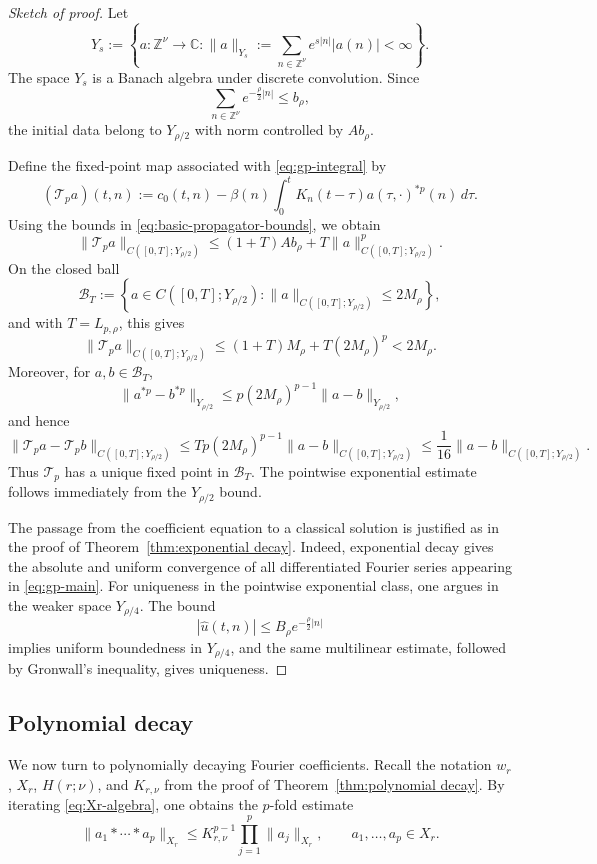\documentclass[12pt,reqno,tbtags]{amsart}
\newcommand\1{\mathbbm{1}}
\begin{document}
\begin{proof}[Sketch of proof]
Let
\[
Y_s
:=
\left\{
a:\mathbb Z^\nu\to\mathbb C:
\|a\|_{Y_s}:=\sum_{n\in\mathbb Z^\nu}e^{s|n|}|a(n)|<\infty
\right\}.
\]
The space $Y_s$ is a Banach algebra under discrete convolution. Since
\[
\sum_{n\in\mathbb Z^\nu}e^{-\frac{\rho}{2}|n|}
\le b_\rho,
\]
the initial data belong to $Y_{\rho/2}$ with norm controlled by $Ab_\rho$.

Define the fixed-point map associated with \eqref{eq:gp-integral} by
\[
(\mathcal T_p a)(t,n)
:=
c_0(t,n)
-
\beta(n)\int_0^t K_n(t-\tau)a(\tau,\cdot)^{*p}(n)\,d\tau .
\]
Using the bounds in \eqref{eq:basic-propagator-bounds}, we obtain
\[
\|\mathcal T_p a\|_{C([0,T];Y_{\rho/2})}
\le
(1+T)Ab_\rho
+
T\|a\|_{C([0,T];Y_{\rho/2})}^{p}.
\]
On the closed ball
\[
\mathcal B_T
:=
\left\{
a\in C([0,T];Y_{\rho/2}):
\|a\|_{C([0,T];Y_{\rho/2})}\le2M_\rho
\right\},
\]
and with $T=L_{p,\rho}$, this gives
\[
\|\mathcal T_p a\|_{C([0,T];Y_{\rho/2})}
\le
(1+T)M_\rho+T(2M_\rho)^p
<2M_\rho.
\]
Moreover, for $a,b\in\mathcal B_T$,
\[
\|a^{*p}-b^{*p}\|_{Y_{\rho/2}}
\le
p(2M_\rho)^{p-1}\|a-b\|_{Y_{\rho/2}},
\]
and hence
\[
\|\mathcal T_p a-\mathcal T_p b\|_{C([0,T];Y_{\rho/2})}
\le
Tp(2M_\rho)^{p-1}
\|a-b\|_{C([0,T];Y_{\rho/2})}
\le
\frac1{16}
\|a-b\|_{C([0,T];Y_{\rho/2})}.
\]
Thus $\mathcal T_p$ has a unique fixed point in $\mathcal B_T$. The pointwise
exponential estimate follows immediately from the $Y_{\rho/2}$ bound.

The passage from the coefficient equation to a classical solution is justified as
in the proof of Theorem~\ref{thm:exponential decay}. Indeed, exponential decay
gives the absolute and uniform convergence of all differentiated Fourier series
appearing in \eqref{eq:gp-main}. For uniqueness in the pointwise exponential class,
one argues in the weaker space $Y_{\rho/4}$. The bound
\[
|\widehat u(t,n)|\le B_\rho e^{-\frac{\rho}{2}|n|}
\]
implies uniform boundedness in $Y_{\rho/4}$, and the same multilinear estimate,
followed by Gronwall's inequality, gives uniqueness.
\end{proof}

\subsection{Polynomial decay}

We now turn to polynomially decaying Fourier coefficients. Recall the notation
$w_r$, $X_r$, $H(r;\nu)$, and $K_{r,\nu}$ from the proof of
Theorem~\ref{thm:polynomial decay}. By iterating \eqref{eq:Xr-algebra}, one obtains
the $p$-fold estimate
\begin{equation}\label{eq:p-fold-Xr-algebra}
\|a_1*\cdots*a_p\|_{X_r}
\le
K_{r,\nu}^{p-1}
\prod_{j=1}^p\|a_j\|_{X_r},
\qquad a_1,\ldots,a_p\in X_r .
\end{equation}
\end{document}
